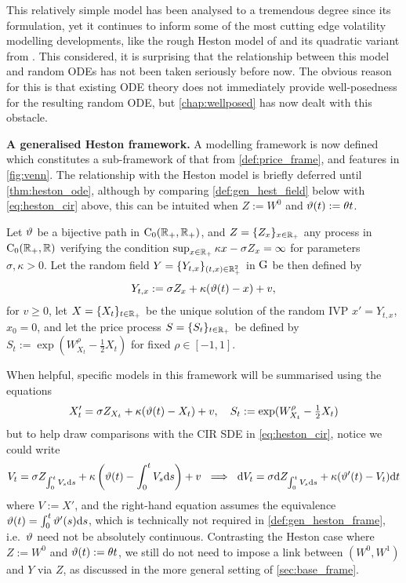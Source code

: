 This relatively simple model has been analysed to a tremendous degree since its formulation, yet it continues to inform some of the most cutting edge volatility modelling developments, like the rough Heston model of \cite{eleuch_2019a} and its quadratic variant from \cite{gatheral_2020}. This considered, it is surprising that the relationship between this model and random ODEs has not been taken seriously before now. The obvious reason for this is that existing ODE theory does not immediately provide well-posedness for the resulting random ODE, but \autoref{chap:wellposed} has now dealt with this obstacle.

\vspace{3mm}\textbf{A generalised Heston framework.} A modelling framework is now defined which constitutes a sub-framework of that from \autoref{def:price_frame}, and features in \autoref{fig:venn}. The relationship with the Heston model is briefly deferred until \autoref{thm:heston_ode}, although by comparing \autoref{def:gen_hest_field} below with \autoref{eq:heston_cir} above, this can be intuited when $Z:=W^0$ and $\vartheta(t):=\theta t$.

\begin{definition}\label{def:gen_heston_frame}
    Let $\vartheta$ be a
    bijective path in $\mathrm{C}_0(\mathbb{R}_+,\mathbb{R}_+)$, and $Z=\{Z_x\}_{x\in\mathbb{R}_+}$ any process in $\mathrm{C}_0(\mathbb{R}_+,\mathbb{R})$ verifying the condition $\sup_{x\in\mathbb{R}_+}\kappa x - \sigma Z_x=\infty$ for parameters $\sigma,\kappa > 0$. Let the random field $Y=\{Y_{t,x}\}_{(t,x)\in\mathbb{R}_+^2}$ in $\mathrm{G}$ be then defined by
    \begin{equation}\label{def:gen_hest_field}
        Y_{t,x} := \sigma Z_x + \kappa(\vartheta(t) - x) + v,
    \end{equation}
    for $v\ge0$, let $X=\{X_t\}_{t\in\mathbb{R}_+}$ be the unique solution of the random IVP $x'=Y_{t,x}$, $x_0=0$, and let the price process $S=\{S_t\}_{t\in\mathbb{R}_+}$ be defined by $S_t:=\exp(W^\rho_{X_t}-\frac12 X_t)$ for fixed $\rho\in[-1,1]$.
\end{definition}

When helpful, specific models in this framework will be summarised using the equations
\begin{equation}\label{eq:model_summary}
    X'_t = \sigma Z_{X_t} + \kappa(\vartheta(t) - X_t) + v,\quad S_t:=\exp(W^\rho_{X_t}-\tfrac12 X_t)
\end{equation}
but to help draw comparisons with the CIR SDE in \autoref{eq:heston_cir}, notice we could write
\begin{equation}\label{eq:model_summary2}
    V_t = \sigma Z_{\int_0^t V_s\mathrm{d} s} + \kappa\left(\vartheta(t) - \int_0^t V_s\mathrm{d} s\right) + v\ \implies\ \mathrm{d} V_t = \sigma \mathrm{d} Z_{\int_0^t V_s\mathrm{d} s} + \kappa(\vartheta'(t) - V_t)\mathrm{d} t
\end{equation}
where $V:=X'$, and the right-hand equation assumes the equivalence $\vartheta(t)=\int_0^t\vartheta'(s)\mathrm{d} s$, which is technically not required in \autoref{def:gen_heston_frame}, i.e.~$\vartheta$ need not be absolutely continuous. Contrasting the Heston case where $Z:=W^0$ and $\vartheta(t):=\theta t$, we still do not need to impose a link between $(W^0, W^1)$ and $Y$ via $Z$, as discussed in the more general setting of \autoref{sec:base_frame}.

